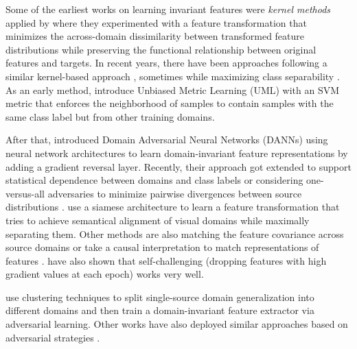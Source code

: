 Some of the earliest works on learning invariant features were \emph{kernel methods} applied by \citet{MuandetBS13}  where they experimented with a feature transformation that minimizes the across-domain dissimilarity between transformed feature distributions while preserving the functional relationship between original features and targets. In recent years, there have been approaches following a similar kernel-based approach \citep{LiGTLT18, LiTGLLZT18}, sometimes while maximizing class separability \citep{Hu0CC19, GhifaryBKZ17}. As an early method, \citet{FangXR13} introduce Unbiased Metric Learning (UML) with an SVM metric that enforces the neighborhood of samples to contain samples with the same class label but from other training domains.

After that, \citet{GaninUAGLLML16} introduced Domain Adversarial Neural Networks (DANNs) using neural network architectures to learn domain-invariant feature representations by adding a gradient reversal layer. Recently, their approach got extended to support statistical dependence between domains and class labels \citep{AkuzawaIM19} or considering one-versus-all adversaries to minimize pairwise divergences between source distributions \citep{albuquerque2019generalizing}. \citet{MotiianPAD17} use a siamese architecture to learn a feature transformation that tries to achieve semantical alignment of visual domains while maximally separating them. Other methods are also matching the feature covariance across source domains \citep{RahmanFBS20} or take a causal interpretation to match representations of features \citep{mahajan2020domain}. \citet{huang2020selfchallenging} have also shown that self-challenging (\ie dropping features with high gradient values at each epoch) works very well. 

\citet{MatsuuraH20} use clustering techniques to split single-source domain generalization into different domains and then train a domain-invariant feature extractor via adversarial
learning. Other works have also deployed similar approaches based on adversarial strategies \citep{deng2020representation, Jia_2020_CVPR_SSDG}.

